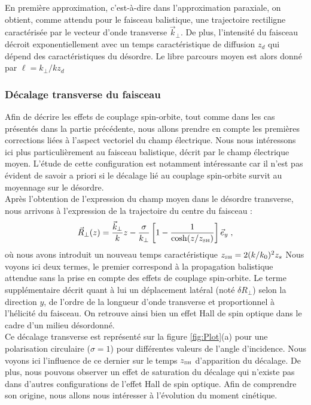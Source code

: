 \documentclass[a4paper,11pt]{article} %
\begin{document}
	En première approximation, c'est-à-dire dans l'approximation paraxiale, on obtient, comme attendu pour le faisceau balistique, une trajectoire rectiligne caractérisée par le vecteur d'onde transverse $ \vec{k}_\perp $. De plus, l'intensité du faisceau décroit exponentiellement avec un temps caractéristique de diffusion $ z_d $ qui dépend des caractéristiques du désordre. Le libre parcours moyen est alors donné par $ \ell = k_\perp/k z_d $\\
	
	\subsubsection{Décalage transverse du faisceau}
	
	Afin de décrire les effets de couplage spin-orbite, tout comme dans les cas présentés dans la partie précédente, nous allons prendre en compte les premières corrections liées à l'aspect vectoriel du champ électrique. Nous nous intéressons ici plus particulièrement au faisceau balistique, décrit par le champ électrique moyen. L'étude de cette configuration est notamment intéressante car il n'est pas évident de savoir a priori si le décalage lié au couplage spin-orbite survit au moyennage sur le désordre.\\
	
	Après l'obtention de l'expression du champ moyen dans le désordre transverse, nous arrivons à l'expression de la trajectoire du centre du faisceau :
	\begin{equation*}
		\vec{R}_\perp (z) = \frac{\vec{k}_\perp}{k} z - \frac{\sigma}{k_\perp} \left[ 1 - \frac{1}{\cosh (z/z_\text{\tiny SH})} \right] \vec{e}_y \; ,
	\end{equation*}
	où nous avons introduit un nouveau temps caractéristique $ z_\text{{\tiny SH}} = 2 (k/k_0)^2 z_s  $ Nous voyons ici deux termes, le premier correspond à la propagation balistique attendue sans la prise en compte des effets de couplage spin-orbite. Le terme supplémentaire décrit quant à lui un déplacement latéral (noté $ \delta R_\perp $) selon la direction $y$, de l'ordre de la longueur d'onde transverse et proportionnel à l'hélicité du faisceau. On retrouve ainsi bien un effet Hall de spin optique dans le cadre d'un milieu désordonné.\\
	
	
	Ce décalage transverse est représenté sur la figure \ref{fig:Plot}(a) pour une polarisation circulaire ($\sigma = 1$) pour différentes valeurs de l'angle d'incidence. Nous voyons ici l'influence de ce dernier sur le temps $ z_\text{{\tiny SH}} $ d'apparition du décalage. De plus, nous pouvons observer un effet de saturation du décalage qui n'existe pas dans d'autres configurations de l'effet Hall de spin optique. Afin de comprendre son origine, nous allons nous intéresser à l'évolution du moment cinétique.
	
\end{document}
